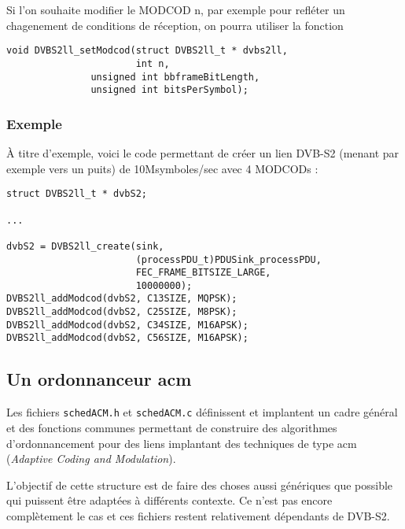 \documentclass{article}
\begin{document}
   Si l'on souhaite modifier le MODCOD n, par exemple pour refléter un
chagenement de conditions de réception, on pourra utiliser la fonction

\begin{verbatim}
void DVBS2ll_setModcod(struct DVBS2ll_t * dvbs2ll,
                       int n,
		       unsigned int bbframeBitLength,
		       unsigned int bitsPerSymbol);
\end{verbatim}

\subsubsection{Exemple}

   À titre d'exemple, voici le code permettant de créer un lien DVB-S2
(menant par exemple vers un puits) de 10Msymboles/sec avec 4 MODCODs :

\begin{verbatim}
struct DVBS2ll_t * dvbS2;

...

dvbS2 = DVBS2ll_create(sink,
                       (processPDU_t)PDUSink_processPDU,
                       FEC_FRAME_BITSIZE_LARGE,
                       10000000);
DVBS2ll_addModcod(dvbS2, C13SIZE, MQPSK);
DVBS2ll_addModcod(dvbS2, C25SIZE, M8PSK);
DVBS2ll_addModcod(dvbS2, C34SIZE, M16APSK);
DVBS2ll_addModcod(dvbS2, C56SIZE, M16APSK);
\end{verbatim}

%
\subsection{Un ordonnanceur {\sc acm}}

   Les fichiers {\tt schedACM.h} et {\tt schedACM.c} définissent et
implantent un cadre général et des fonctions communes permettant de
construire des algorithmes d'ordonnancement pour des liens implantant
des techniques de type {\sc acm} ({\em Adaptive Coding and
  Modulation}).

   L'objectif de cette structure est de faire des choses aussi
génériques que possible qui puissent être adaptées à différents
contexte. Ce n'est pas encore complètement le cas et ces fichiers
restent relativement dépendants de DVB-S2.

%
\end{document}

